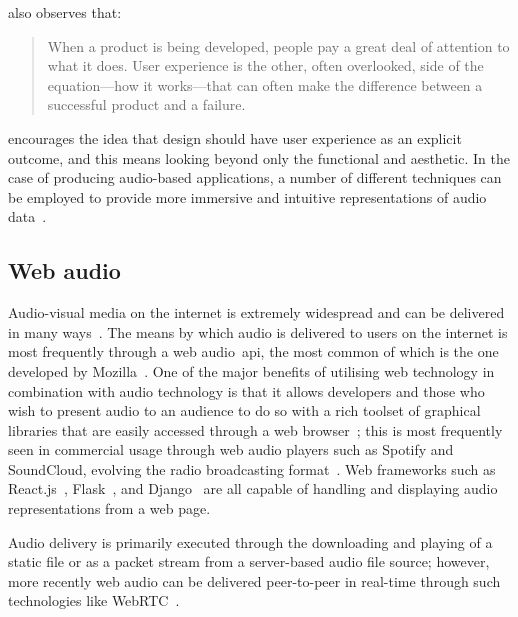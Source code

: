 \citet{garrett2010elements} also observes that:

\begin{quotation}
    When a product is being developed, people pay a great deal of attention to what it does.
    User experience is the other, often overlooked, side of the equation—how it works—that can often make the difference between a successful product and a failure.
\end{quotation}

\citet{garrett2010elements} encourages the idea that design should have user experience as an explicit outcome,
and this means looking beyond only the functional and aesthetic.
In the case of producing audio-based applications,
a number of different techniques can be employed
to provide more immersive and intuitive representations of audio data~\citep{geolocation-player, discovery-collections}.


\subsection{Web audio}\label{subsec:web-audio}

Audio-visual media on the internet is extremely widespread and can be delivered in many ways~\citep{Bruegger2018}.
The means by which audio is delivered to users on the internet is most frequently through a web audio~\gls{api}, the most common of which is the one developed by Mozilla~\citep{w3c_audio_api, mdn_audio_api}.
One of the major benefits of utilising web technology in combination with audio technology is that it allows developers and those who wish to present audio to an audience to do so with a rich toolset of graphical libraries that are easily accessed through a web browser~\citep{Pauwels2018pywebaudioplayerBT};
this is most frequently seen in commercial usage through web audio players such as Spotify and SoundCloud, evolving the radio broadcasting format~\citep{Bottomley2020}.
Web frameworks such as React.js~\citep{Minnick2022}, Flask~\citep{Zhai2022},
and Django~\citep{Pauwels2018pywebaudioplayerBT} are all capable of handling and displaying audio representations from a web page.

Audio delivery is primarily executed through the downloading and playing of a static file or as a packet stream from a server-based audio file source;
however, more recently web audio can be delivered peer-to-peer in real-time through such technologies like WebRTC~\citep{webrtc, Garcia2019}.
